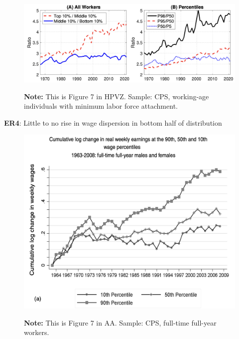 \documentclass[11pt, aspectratio=169]{beamer}
\begin{document}
\begin{frame}{}
	\begin{figure}
		\includegraphics[scale=0.4]{./figures/inequality_wage_2}
	\vspace*{-2mm}
	\begin{flushleft}
		{\scriptsize \hspace{6mm} \textbf{Note:} This is Figure 7 in HPVZ. Sample: CPS, working-age individuals with minimum labor force attachment.}
	\end{flushleft}	
	\end{figure}

	\vspace{2mm}
	{\color{blue}\textbf{ER4}}: Little to no rise in wage dispersion in bottom half of distribution
\end{frame}


\begin{frame}{}
	\begin{figure}
		\includegraphics[scale=0.32]{./figures/inequality_wage_12}
	\vspace*{-2mm}
	\begin{flushleft}
		{\scriptsize \hspace{6mm} \textbf{Note:} This is Figure 7 in AA. Sample: CPS, full-time full-year workers.}
	\end{flushleft}	
	\end{figure}
\end{frame}
\end{document}

